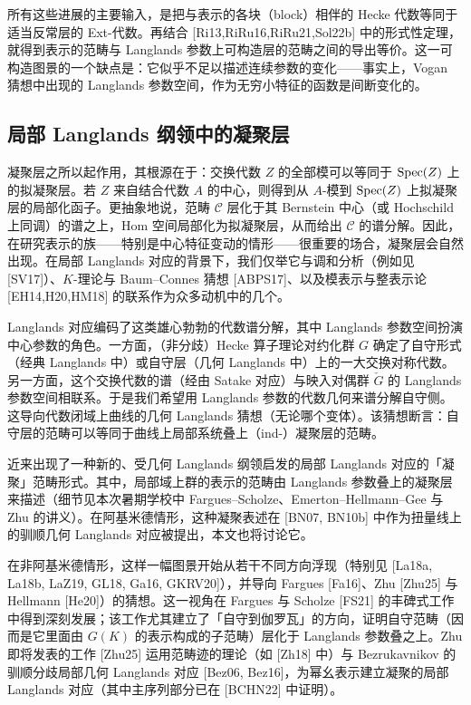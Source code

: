 所有这些进展的主要输入，是把与表示的各块（block）相伴的 Hecke 代数等同于适当反常层的 Ext-代数。再结合 [Ri13,RiRu16,RiRu21,Sol22b] 中的形式性定理，就得到表示的范畴与 Langlands 参数上可构造层的范畴之间的导出等价。这一可构造图景的一个缺点是：它似乎不足以描述连续参数的变化——事实上，Vogan 猜想中出现的 Langlands 参数空间，作为无穷小特征的函数是间断变化的。

\subsection{局部 Langlands 纲领中的凝聚层}

凝聚层之所以起作用，其根源在于：交换代数 $Z$ 的全部模可以等同于 $\operatorname{Spec}(Z)$ 上的拟凝聚层。若 $Z$ 来自结合代数 $A$ 的中心，则得到从 $A$-模到 $\operatorname{Spec}(Z)$ 上拟凝聚层的局部化函子。更抽象地说，范畴 $\mathcal C$ 层化于其 Bernstein 中心（或 Hochschild 上同调）的谱之上，Hom 空间局部化为拟凝聚层，从而给出 $\mathcal C$ 的谱分解。因此，在研究表示的族——特别是中心特征变动的情形——很重要的场合，凝聚层会自然出现。在局部 Langlands 对应的背景下，我们仅举它与调和分析（例如见 [SV17]）、$K$-理论与 Baum--Connes 猜想 [ABPS17]、以及模表示与整表示论 [EH14,H20,HM18] 的联系作为众多动机中的几个。

Langlands 对应编码了这类雄心勃勃的代数谱分解，其中 Langlands 参数空间扮演中心参数的角色。一方面，（非分歧）Hecke 算子理论对约化群 $G$ 确定了自守形式（经典 Langlands 中）或自守层（几何 Langlands 中）上的一大交换对称代数。另一方面，这个交换代数的谱（经由 Satake 对应）与映入对偶群 $\check G$ 的 Langlands 参数空间相联系。于是我们希望用 Langlands 参数的代数几何来谱分解自守侧。这导向代数闭域上曲线的几何 Langlands 猜想（无论哪个变体）。该猜想断言：自守层的范畴可以等同于曲线上局部系统叠上（ind-）凝聚层的范畴。

近来出现了一种新的、受几何 Langlands 纲领启发的局部 Langlands 对应的「凝聚」范畴形式。其中，局部域上群的表示的范畴由 Langlands 参数叠上的凝聚层来描述（细节见本次暑期学校中 Fargues--Scholze、Emerton--Hellmann--Gee 与 Zhu 的讲义）。在阿基米德情形，这种凝聚表述在 [BN07, BN10b] 中作为扭量线上的驯顺几何 Langlands 对应被提出，本文也将讨论它。

在非阿基米德情形，这样一幅图景开始从若干不同方向浮现（特别见 [La18a, La18b, LaZ19, GL18, Ga16, GKRV20]），并导向 Fargues [Fa16]、Zhu [Zhu25] 与 Hellmann [He20]）的猜想。这一视角在 Fargues 与 Scholze [FS21] 的丰碑式工作中得到深刻发展；该工作尤其建立了「自守到伽罗瓦」的方向，证明自守范畴（因而是它里面由 $G(K)$ 的表示构成的子范畴）层化于 Langlands 参数叠之上。Zhu 即将发表的工作 [Zhu25] 运用范畴迹的理论（如 [Zh18] 中）与 Bezrukavnikov 的驯顺分歧局部几何 Langlands 对应 [Bez06, Bez16]，为幂幺表示建立凝聚的局部 Langlands 对应（其中主序列部分已在 [BCHN22] 中证明）。

